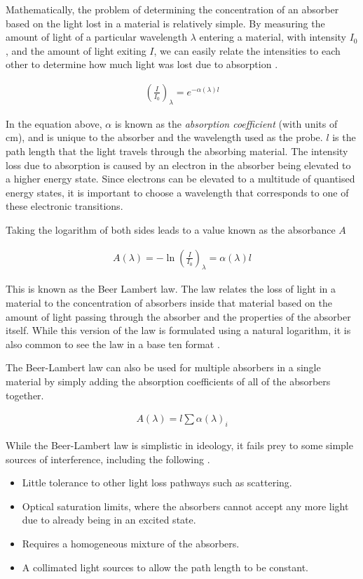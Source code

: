 Mathematically, the problem of determining the concentration of an absorber
based on the light lost in a material is relatively simple. By measuring the
amount of light of a particular wavelength $\lambda$ entering a material, with
intensity $I_0$, and the amount of light exiting $I$, we can easily relate the
intensities to each other to determine how much light was lost due to
absorption \cite{Hollas:2004uh}.

\begin{align}
  \left(\frac{I}{I_0}\right)_\lambda = e^{-\alpha(\lambda)l}
\end{align}

In the equation above, $\alpha$ is known as the \emph{absorption coefficient}
(with units of cm), and is unique to the absorber and the wavelength
used as the probe. $l$ is the path length that the light travels through the
absorbing material. The intensity loss due to absorption is caused by an
electron in the absorber being elevated to a higher energy state. Since
electrons can be elevated to a multitude of quantised energy states, it is
important to choose a wavelength that corresponds to one of these electronic
transitions.

Taking the logarithm of both sides leads to a value known as the absorbance $A$

\begin{align*}
  A(\lambda)=-\ln\left(\frac{I}{I_0}\right)_\lambda = \alpha(\lambda)l\label{eq:beer}
\end{align*}

This is known as the Beer Lambert law. The law relates the loss of light in a
material to the concentration of absorbers inside that material based on the
amount of light passing through the absorber and the properties of the absorber
itself.  While this version of the  law is formulated using a natural logarithm, it is also common to see the law in a base ten format \cite{Hollas:2004uh}.

The Beer-Lambert law can also be used for multiple absorbers in a single material by simply adding the absorption coefficients of all of the absorbers together.

\begin{align*}
  A(\lambda) = l\sum\alpha(\lambda)_i
\end{align*}

While the Beer-Lambert law is simplistic in ideology, it fails prey to some simple sources of interference, including the following \cite{Skoog:1994wg}.
\begin{itemize}
  \item Little tolerance to other light loss pathways such as scattering.
  \item Optical saturation limits, where the absorbers cannot accept any more light due to already being in an excited state.
  \item Requires a homogeneous mixture of the absorbers.
  \item A collimated light sources to allow the path length to be constant.
\end{itemize}

